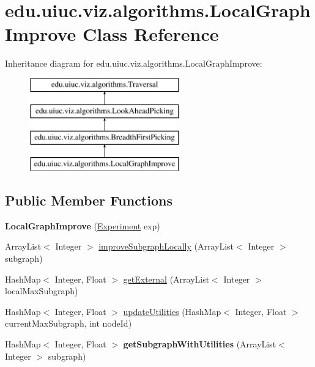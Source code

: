 \hypertarget{classedu_1_1uiuc_1_1viz_1_1algorithms_1_1_local_graph_improve}{}\section{edu.\+uiuc.\+viz.\+algorithms.\+Local\+Graph\+Improve Class Reference}
\label{classedu_1_1uiuc_1_1viz_1_1algorithms_1_1_local_graph_improve}
Inheritance diagram for edu.\+uiuc.\+viz.\+algorithms.\+Local\+Graph\+Improve\+:\begin{figure}[H]
\begin{center}
\leavevmode
\includegraphics[height=4.000000cm]{classedu_1_1uiuc_1_1viz_1_1algorithms_1_1_local_graph_improve}
\end{center}
\end{figure}
\subsection*{Public Member Functions}
\begin{DoxyCompactItemize}
\item 
\mbox{\label{classedu_1_1uiuc_1_1viz_1_1algorithms_1_1_local_graph_improve_a7d7c2e993a45e2983ad6be3b0d2b345b}} 
{\bfseries Local\+Graph\+Improve} (\mbox{\hyperlink{classedu_1_1uiuc_1_1viz_1_1algorithms_1_1_experiment}{Experiment}} exp)
\item 
Array\+List$<$ Integer $>$ \mbox{\hyperlink{classedu_1_1uiuc_1_1viz_1_1algorithms_1_1_local_graph_improve_a0c4ae555848219fd07f2aab350d309bf}{improve\+Subgraph\+Locally}} (Array\+List$<$ Integer $>$ subgraph)
\item 
Hash\+Map$<$ Integer, Float $>$ \mbox{\hyperlink{classedu_1_1uiuc_1_1viz_1_1algorithms_1_1_local_graph_improve_aa0e9ee440e5ec2aa978a73207be84230}{get\+External}} (Array\+List$<$ Integer $>$ local\+Max\+Subgraph)
\item 
Hash\+Map$<$ Integer, Float $>$ \mbox{\hyperlink{classedu_1_1uiuc_1_1viz_1_1algorithms_1_1_local_graph_improve_a181cac5e84e9f3901eec038297fcd708}{update\+Utilities}} (Hash\+Map$<$ Integer, Float $>$ current\+Max\+Subgraph, int node\+Id)
\item 
\mbox{\label{classedu_1_1uiuc_1_1viz_1_1algorithms_1_1_local_graph_improve_a1813b9565b89a8e7a68bb129aa106287}} 
Hash\+Map$<$ Integer, Float $>$ {\bfseries get\+Subgraph\+With\+Utilities} (Array\+List$<$ Integer $>$ subgraph)
\end{DoxyCompactItemize}
